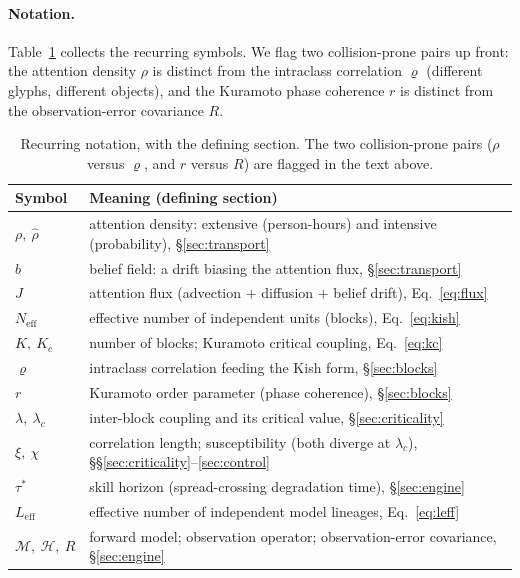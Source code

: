 \documentclass[11pt]{article}
\begin{document}
\paragraph{Notation.} Table~\ref{tab:notation} collects the recurring symbols. We flag two collision-prone pairs up front: the attention density $\rho$ is distinct from the intraclass correlation $\varrho$ (different glyphs, different objects), and the Kuramoto phase coherence $r$ is distinct from the observation-error covariance $R$.

\begin{table}[h]
\centering
\small
\begin{tabular}{@{}ll@{}}
\toprule
\textbf{Symbol} & \textbf{Meaning (defining section)} \\
\midrule
$\rho,\ \hat\rho$ & attention density: extensive (person-hours) and intensive (probability), \S\ref{sec:transport} \\
$b$ & belief field: a drift biasing the attention flux, \S\ref{sec:transport} \\
$J$ & attention flux (advection $+$ diffusion $+$ belief drift), Eq.~\eqref{eq:flux} \\
$N_{\mathrm{eff}}$ & effective number of independent units (blocks), Eq.~\eqref{eq:kish} \\
$K,\ K_c$ & number of blocks; Kuramoto critical coupling, Eq.~\eqref{eq:kc} \\
$\varrho$ & intraclass correlation feeding the Kish form, \S\ref{sec:blocks} \\
$r$ & Kuramoto order parameter (phase coherence), \S\ref{sec:blocks} \\
$\lambda,\ \lambda_c$ & inter-block coupling and its critical value, \S\ref{sec:criticality} \\
$\xi,\ \chi$ & correlation length; susceptibility (both diverge at $\lambda_c$), \S\S\ref{sec:criticality}--\ref{sec:control} \\
$\tau^\ast$ & skill horizon (spread-crossing degradation time), \S\ref{sec:engine} \\
$L_{\mathrm{eff}}$ & effective number of independent model lineages, Eq.~\eqref{eq:leff} \\
$\mathcal{M},\ \mathcal{H},\ R$ & forward model; observation operator; observation-error covariance, \S\ref{sec:engine} \\
\bottomrule
\end{tabular}
\caption{Recurring notation, with the defining section. The two collision-prone pairs ($\rho$ versus $\varrho$, and $r$ versus $R$) are flagged in the text above.}
\label{tab:notation}
\end{table}
\end{document}
